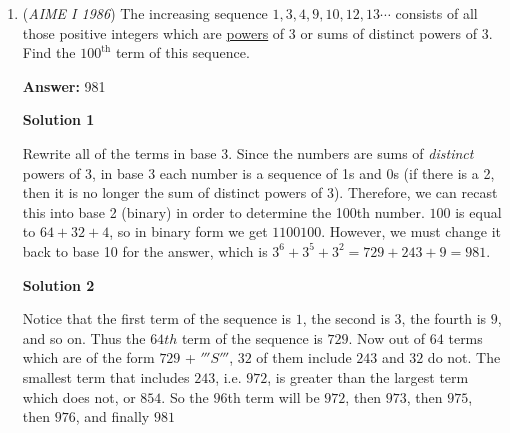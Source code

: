 \begin{enumerate}
\textbf{Solution 2}

Use the same method as above where you represent the sum of integers from $1$ to $n$ expressed as $\frac{n(n + 1)}{2}$, plus the additional page number $k$. We can establish an upper and lower bound for the number of pages contained in the book, where the upper bound maximizes the sum of the pages and the lower bound maximizes the extra page (and thus minimizes the total sum of the pages.) 

 $\frac{n(n + 1)}{2} = 1986$ is the quadratic you must solve to obtain the upper bound of $n$ and $\frac{n(n + 1)}{2} + n = 1986$ is the quadratic you must solve to obtain the lower bound of $n$. 

 Solving the two equations gives values that are respectively around $62.5$ and $61.5$ with the quadratic formula, and the only integer between the two is $62$. 

 This implies that we can plug in $62$ and come to the same conclusion as the above solution where $x = \boxed{033}$.

 


	\item (\textit{AIME I 1986}) The increasing sequence $1,3,4,9,10,12,13\cdots$ consists of all those positive integers which are \href{https://artofproblemsolving.com/wiki/index.php?title=Powers&action=edit&redlink=1}{powers} of 3 or sums of distinct powers of 3. Find the $100^{\mbox{th}}$ term of this sequence.


 
 \textbf{Answer: }981



\textbf{Solution 1}

Rewrite all of the terms in base 3. Since the numbers are sums of \textit{distinct} powers of 3, in base 3 each number is a sequence of 1s and 0s (if there is a 2, then it is no longer the sum of distinct powers of 3). Therefore, we can recast this into base 2 (binary) in order to determine the 100th number. $100$ is equal to $64 + 32 + 4$, so in binary form we get $1100100$. However, we must change it back to base 10 for the answer, which is $3^6 + 3^5 + 3^2 = 729 + 243 + 9 = \boxed {981}$.

 



\textbf{Solution 2}

Notice that the first term of the sequence is $1$, the second is $3$, the fourth is $9$, and so on. Thus the $64th$ term of the sequence is $729$. Now out of $64$ terms which are of the form $729$ + $'''S'''$, $32$ of them include $243$ and $32$ do not. The smallest term that includes $243$, i.e. $972$, is greater than the largest term which does not, or $854$. So the $96$th term will be $972$, then $973$, then $975$, then $976$, and finally $\boxed{981}$





\end{enumerate}
